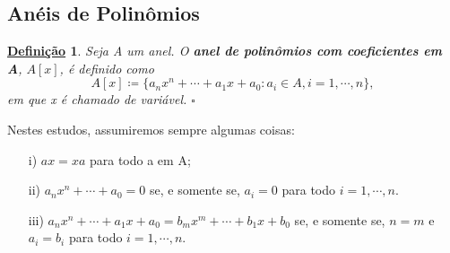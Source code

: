 \documentclass{article}
\newtheorem*{def*}{\underline{Defini\c c\~ao}}
\begin{document}
\subsection{Anéis de Polinômios}
\begin{def*}
  Seja A um anel. O \textbf{anel de polinômios com coeficientes em A}, \(A[x]\), é definido como 
  \[
    A[x]\coloneqq \{a_{n}x^{n}+\cdots+a_{1}x + a_{0}: a_{i}\in A, i = 1, \cdots, n\},
  \]
em que x é chamado de variável. \(\square\)
\end{def*}
  Nestes estudos, assumiremos sempre algumas coisas:
 \begin{itemize}
   \item[i)] \(ax = xa\) para todo a em A;
   \item[ii)] \(a_{n}x^{n} + \cdots + a_{0} = 0\) se, e somente se, \(a_{i} = 0\) para todo \(i=1, \cdots, n.\)
   \item[iii)] \(a_{n}x^{n} + \cdots + a_{1}x + a_{0} = b_{m}x^{m} + \cdots + b_{1}x + b_{0}\) se, e somente se, \(n=m\) e \(a_{i} = b_{i}\) para todo \(i=1, \cdots, n\).
 \end{itemize}
\end{document}
